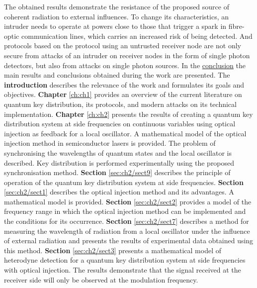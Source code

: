 \newline The obtained results demonstrate the resistance of the proposed source of coherent radiation to external influences. To change its characteristics, an intruder needs to operate at powers close to those that trigger a spark in fibre-optic communication lines, which carries an increased risk of being detected. And protocols based on the protocol using an untrusted receiver node are not only secure from attacks of an intruder on receiver nodes in the form of single photon detectors, but also from attacks on single photon sources.
\newline In the \underline{conclusion} the main results and conclusions obtained during the work are presented.
\newline The \textbf{introduction} describes the relevance of the work and formulates its goals and objectives.
\newline \textbf{Chapter} \ref{ch:ch1} provides an overview of the current literature on quantum key distribution, its protocols, and modern attacks on its technical implementation.
\newline \textbf{Chapter} \ref{ch:ch2} presents the results of creating a quantum key distribution system at side frequencies on continuous variables using optical injection as feedback for a local oscillator. A mathematical model of the optical injection method in semiconductor lasers is provided. The problem of synchronising the wavelengths of quantum states and the local oscillator is described. Key distribution is performed experimentally using the proposed synchronisation method.
\newline \textbf{Section} \ref{sec:ch2/sect9} describes the principle of operation of the quantum key distribution system at side frequencies.
\newline \textbf{Section} \ref{sec:ch2/sect1} describes the optical injection method and its advantages. A mathematical model is provided.
\newline \textbf{Section} \ref{sec:ch2/sect2} provides a model of the frequency range in which the optical injection method can be implemented and the conditions for its occurrence.
\newline \textbf{Section} \ref{sec:ch2/sect7} describes a method for measuring the wavelength of radiation from a local oscillator under the influence of external radiation and presents the results of experimental data obtained using this method.
\newline \textbf{Section} \ref{sec:ch2/sect3} presents a mathematical model of heterodyne detection for a quantum key distribution system at side frequencies with optical injection. The results demonstrate that the signal received at the receiver side will only be observed at the modulation frequency.
